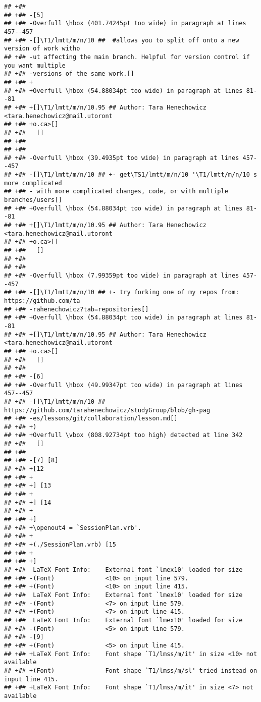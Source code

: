 \documentclass[ignorenonframetext,]{beamer}
\begin{document}
\begin{verbatim}
## +##  
## +## -[5]
## +## -Overfull \hbox (401.74245pt too wide) in paragraph at lines 457--457
## +## -[]\T1/lmtt/m/n/10 ##  #allows you to split off onto a new version of work witho
## +## -ut affecting the main branch. Helpful for version control if you want multiple 
## +## -versions of the same work.[] 
## +## +
## +## +Overfull \hbox (54.88034pt too wide) in paragraph at lines 81--81
## +## +[]\T1/lmtt/m/n/10.95 ## Author: Tara Henechowicz <tara.henechowicz@mail.utoront
## +## +o.ca>[] 
## +##   []
## +##  
## +##  
## +## -Overfull \hbox (39.4935pt too wide) in paragraph at lines 457--457
## +## -[]\T1/lmtt/m/n/10 ## +- get\TS1/lmtt/m/n/10 '\T1/lmtt/m/n/10 s more complicated
## +## - with more complicated changes, code, or with multiple branches/users[] 
## +## +Overfull \hbox (54.88034pt too wide) in paragraph at lines 81--81
## +## +[]\T1/lmtt/m/n/10.95 ## Author: Tara Henechowicz <tara.henechowicz@mail.utoront
## +## +o.ca>[] 
## +##   []
## +##  
## +##  
## +## -Overfull \hbox (7.99359pt too wide) in paragraph at lines 457--457
## +## -[]\T1/lmtt/m/n/10 ## +- try forking one of my repos from: https://github.com/ta
## +## -rahenechowicz?tab=repositories[] 
## +## +Overfull \hbox (54.88034pt too wide) in paragraph at lines 81--81
## +## +[]\T1/lmtt/m/n/10.95 ## Author: Tara Henechowicz <tara.henechowicz@mail.utoront
## +## +o.ca>[] 
## +##   []
## +##  
## +## -[6]
## +## -Overfull \hbox (49.99347pt too wide) in paragraph at lines 457--457
## +## -[]\T1/lmtt/m/n/10 ##  https://github.com/tarahenechowicz/studyGroup/blob/gh-pag
## +## -es/lessons/git/collaboration/lesson.md[] 
## +## +)
## +## +Overfull \vbox (808.92734pt too high) detected at line 342
## +##   []
## +##  
## +## -[7] [8]
## +## +[12
## +## +
## +## +] [13
## +## +
## +## +] [14
## +## +
## +## +]
## +## +\openout4 = `SessionPlan.vrb'.
## +## +
## +## +(./SessionPlan.vrb) [15
## +## +
## +## +]
## +##  LaTeX Font Info:    External font `lmex10' loaded for size
## +## -(Font)              <10> on input line 579.
## +## +(Font)              <10> on input line 415.
## +##  LaTeX Font Info:    External font `lmex10' loaded for size
## +## -(Font)              <7> on input line 579.
## +## +(Font)              <7> on input line 415.
## +##  LaTeX Font Info:    External font `lmex10' loaded for size
## +## -(Font)              <5> on input line 579.
## +## -[9]
## +## +(Font)              <5> on input line 415.
## +## +LaTeX Font Info:    Font shape `T1/lmss/m/it' in size <10> not available
## +## +(Font)              Font shape `T1/lmss/m/sl' tried instead on input line 415.
## +## +LaTeX Font Info:    Font shape `T1/lmss/m/it' in size <7> not available

\end{verbatim}
\end{document}
